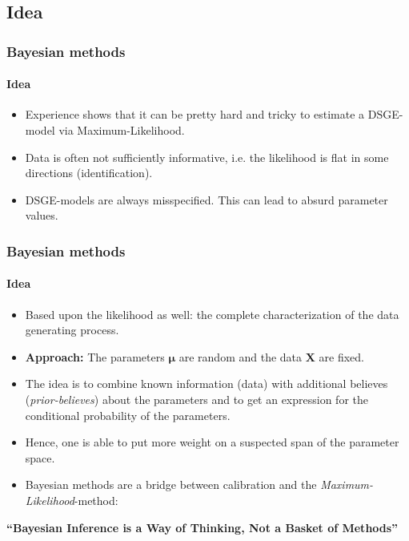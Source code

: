 \documentclass{beamer} %
\begin{document}
\subsection{Idea}
\begin{frame}\frametitle{Bayesian methods}\framesubtitle{Idea}
\begin{itemize}
  \item Experience shows that it can be pretty hard and tricky to estimate a DSGE-model via Maximum-Likelihood.
  \item Data is often not sufficiently informative, i.e. the likelihood is flat in some directions (identification).
  \item DSGE-models are always misspecified. This can lead to absurd parameter values.
\end{itemize}
\end{frame}

\begin{frame}\frametitle{Bayesian methods}\framesubtitle{Idea}
\begin{itemize}
  \item Based upon the likelihood as well: the complete characterization of the data generating process.
  \item \textbf{Approach:} The parameters $\boldsymbol{\mu}$ are random and the data $\mathbf{X}$ are fixed.
  \item The idea is to combine known information (data) with additional believes (\emph{prior-believes}) about the parameters and to get an expression for the conditional probability of the parameters.
  \item Hence, one is able to put more weight on a suspected span of the parameter space.
  \item Bayesian methods are a bridge between calibration and the \emph{Maximum-Likelihood}-method:
\end{itemize}
\textbf{\enquote{Bayesian Inference is a Way of Thinking, Not a Basket of Methods}}
\end{frame}
\end{document}
